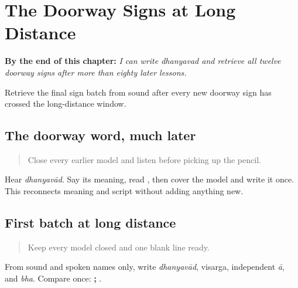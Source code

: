 
\chapter{The Doorway Signs at Long Distance}
\label{ch:doorway-script-distance}

\begin{chapteropening}
\textbf{By the end of this chapter:} \emph{I can write dhanyavad and retrieve all twelve doorway signs after more than eighty later lessons.}

Retrieve the final sign batch from sound after every new doorway sign has crossed the long-distance window.
\end{chapteropening}

\section[dhanyavād]{The doorway word, much later}

\label{lesson:MR-R18-script-warmup}



\begin{quote}
Close every earlier model and listen before picking up the pencil.
\end{quote}

\begin{tcolorbox}[breakable,colback=teal!4,colframe=teal!35!black,title={Before you move on}]
Hear \emph{dhanyavād}. Say its meaning, read \textbf{}, then cover the model and write it once. This reconnects meaning and script without adding anything new.
\end{tcolorbox}
\section[visarga / aa / bha]{First batch at long distance}

\label{lesson:MR-R18-script-a-r4}



\begin{quote}
Keep every model closed and one blank line ready.
\end{quote}

\begin{tcolorbox}[breakable,colback=teal!4,colframe=teal!35!black,title={Before you move on}]
From sound and spoken names only, write \emph{dhanyavād}, visarga, independent \emph{ā}, and \emph{bha}. Compare once: \textbf{;   }.
\end{tcolorbox}
